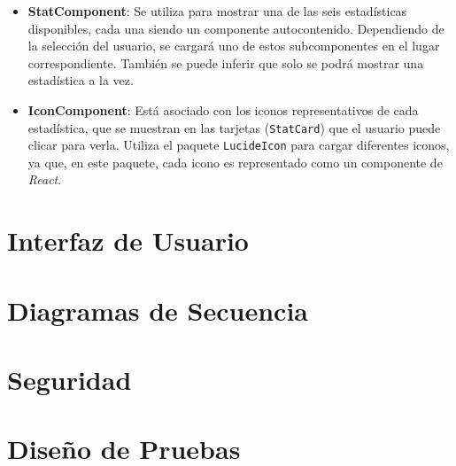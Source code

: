 \begin{itemize}
    \item \textbf{StatComponent}: Se utiliza para mostrar una de las seis estadísticas disponibles, cada una siendo un componente autocontenido. Dependiendo de la selección del usuario, se cargará uno de estos subcomponentes en el lugar correspondiente. También se puede inferir que solo se podrá mostrar una estadística a la vez.
    \item \textbf{IconComponent}: Está asociado con los iconos representativos de cada estadística, que se muestran en las tarjetas (\texttt{StatCard}) que el usuario puede clicar para verla. Utiliza el paquete \texttt{LucideIcon} para cargar diferentes iconos, ya que, en este paquete, cada icono es representado como un componente de \textit{React}.
\end{itemize}



\section{Interfaz de Usuario}

\section{Diagramas de Secuencia}

\section{Seguridad}

\section{Diseño de Pruebas}